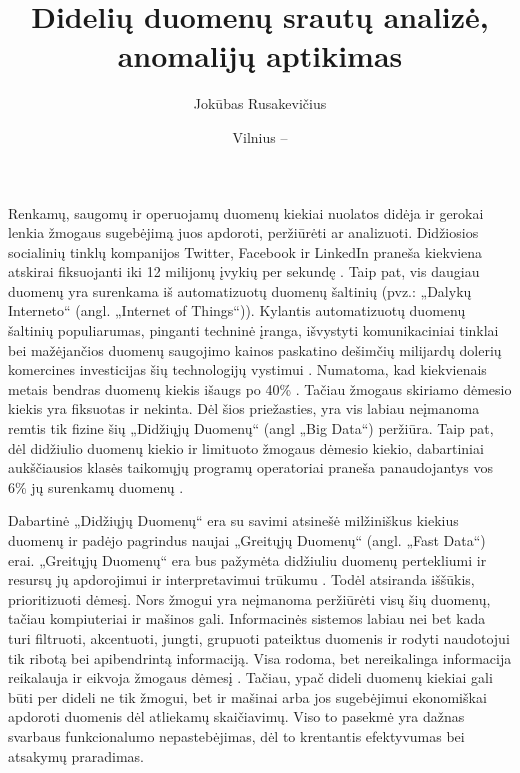 \documentclass{VUMIFPSkursinis}
\title{Didelių duomenų srautų analizė, anomalijų aptikimas}
\author{Jokūbas Rusakevičius}
\date{Vilnius – \the\year}
\begin{document}
\maketitle

\tableofcontents

Renkamų, saugomų ir operuojamų duomenų kiekiai nuolatos didėja ir gerokai lenkia žmogaus sugebėjimą juos apdoroti, peržiūrėti ar analizuoti. Didžiosios socialinių tinklų kompanijos Twitter, Facebook ir LinkedIn praneša kiekviena atskirai fiksuojanti iki 12 milijonų įvykių per sekundę \cite{twitter, facebook, linkedin}. Taip pat, vis daugiau duomenų yra surenkama iš automatizuotų duomenų šaltinių (pvz.: „Dalykų Interneto“ (angl. „Internet of Things“)). Kylantis automatizuotų duomenų šaltinių populiarumas, pinganti techninė įranga, išvystyti komunikaciniai tinklai bei mažėjančios duomenų saugojimo kainos paskatino dešimčių milijardų dolerių komercines investicijas šių technologijų vystimui \cite{iof_investments}. Numatoma, kad kiekvienais metais bendras duomenų kiekis išaugs po 40\% \cite{iof}. Tačiau žmogaus skiriamo dėmesio kiekis yra fiksuotas ir nekinta. Dėl šios priežasties, yra vis labiau neįmanoma remtis tik fizine šių „Didžiųjų Duomenų“ (angl „Big Data“) peržiūra. Taip pat, dėl didžiulio duomenų kiekio ir limituoto žmogaus dėmesio kiekio, dabartiniai aukščiausios klasės taikomųjų programų operatoriai praneša panaudojantys vos 6\% jų surenkamų duomenų \cite{prioritizing_attention}. \par
Dabartinė „Didžiųjų Duomenų“ era su savimi atsinešė milžiniškus kiekius duomenų ir padėjo pagrindus naujai „Greitųjų Duomenų“ (angl. „Fast Data“) erai. „Greitųjų Duomenų“ era bus pažymėta didžiuliu duomenų pertekliumi ir resursų jų apdorojimui ir interpretavimui trūkumu \cite{prioritizing_attention}. Todėl atsiranda iššūkis, prioritizuoti dėmesį. Nors žmogui yra neįmanoma peržiūrėti visų šių duomenų, tačiau kompiuteriai ir mašinos gali. Informacinės sistemos labiau nei bet kada turi filtruoti, akcentuoti, jungti, grupuoti pateiktus duomenis ir rodyti naudotojui tik ribotą bei apibendrintą informaciją. Visa rodoma, bet nereikalinga informacija reikalauja ir eikvoja žmogaus dėmesį \cite{attention}. Tačiau, ypač dideli duomenų kiekiai gali būti per dideli ne tik žmogui, bet ir mašinai arba jos sugebėjimui ekonomiškai apdoroti duomenis dėl atliekamų skaičiavimų. Viso to pasekmė yra dažnas svarbaus funkcionalumo nepastebėjimas, dėl to krentantis efektyvumas bei atsakymų praradimas. \par
\end{document}
